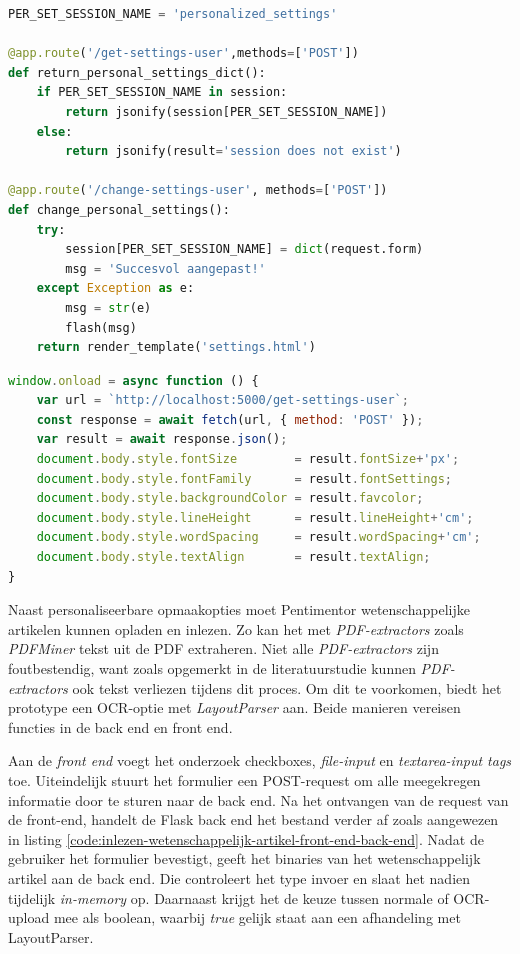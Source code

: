 \begin{lstlisting}[language=python, caption={De back end functie die de aanpassingen uit het formulier opslaat als sessievariabele.}, label={code:back-end-session-personalized}]
PER_SET_SESSION_NAME = 'personalized_settings'

@app.route('/get-settings-user',methods=['POST'])
def return_personal_settings_dict():
	if PER_SET_SESSION_NAME in session:
		return jsonify(session[PER_SET_SESSION_NAME])
	else:
		return jsonify(result='session does not exist')
	
@app.route('/change-settings-user', methods=['POST'])
def change_personal_settings():
	try:
		session[PER_SET_SESSION_NAME] = dict(request.form)
		msg = 'Succesvol aangepast!'
	except Exception as e:
		msg = str(e)
		flash(msg)
	return render_template('settings.html')
\end{lstlisting}

\begin{lstlisting}[language=javascript, caption={De onload-functie die de gepersonaliseerde opmaakopties regelt bij het inladen van een webpagina.}, label={code:window-onload-js}]
window.onload = async function () {
	var url = `http://localhost:5000/get-settings-user`;
	const response = await fetch(url, { method: 'POST' });
	var result = await response.json();
	document.body.style.fontSize        = result.fontSize+'px';
	document.body.style.fontFamily      = result.fontSettings;
	document.body.style.backgroundColor = result.favcolor;
	document.body.style.lineHeight      = result.lineHeight+'cm';
	document.body.style.wordSpacing     = result.wordSpacing+'cm';
	document.body.style.textAlign       = result.textAlign;
}
\end{lstlisting}

Naast personaliseerbare opmaakopties moet Pentimentor wetenschappelijke artikelen kunnen opladen en inlezen. Zo kan het met \textit{PDF-extractors} zoals \textit{PDFMiner} tekst uit de PDF extraheren. Niet alle \textit{PDF-extractors} zijn foutbestendig, want zoals opgemerkt in de literatuurstudie kunnen \textit{PDF-extractors} ook tekst verliezen tijdens dit proces. Om dit te voorkomen, biedt het prototype een OCR-optie met \textit{LayoutParser} aan. Beide manieren vereisen functies in de back end en front end.

\medspace

Aan de \textit{front end} voegt het onderzoek checkboxes, \textit{file-input} en \textit{textarea-input tags} toe. Uiteindelijk stuurt het formulier een POST-request om alle meegekregen informatie door te sturen naar de back end. Na het ontvangen van de request van de front-end, handelt de Flask back end het bestand verder af zoals aangewezen in listing \ref{code:inlezen-wetenschappelijk-artikel-front-end-back-end}. Nadat de gebruiker het formulier bevestigt, geeft het binaries van het wetenschappelijk artikel aan de back end. Die controleert het type invoer en slaat het nadien tijdelijk \textit{in-memory} op. Daarnaast krijgt het de keuze tussen normale of OCR-upload mee als boolean, waarbij \textit{true} gelijk staat aan een afhandeling met LayoutParser.


